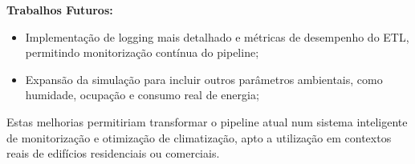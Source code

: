 \documentclass[a4paper, 12pt]{article} %
\begin{document}
\textbf{Trabalhos Futuros:}

\begin{itemize}
	\item Implementação de logging mais detalhado e métricas de desempenho do ETL, permitindo monitorização contínua do pipeline;
	\item Expansão da simulação para incluir outros parâmetros ambientais, como humidade, ocupação e consumo real de energia;
\end{itemize}

Estas melhorias permitiriam transformar o pipeline atual num sistema inteligente de monitorização e otimização de climatização, apto a utilização em contextos reais de edifícios residenciais ou comerciais.

\nocite{*}
\newpage
\printbibliography
\end{document}
